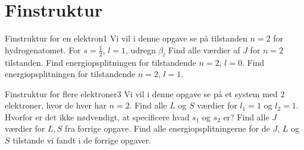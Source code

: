 \section*{Finstruktur}
\begin{opgave}{Finstruktur for en elektron}{1}
Vi vil i denne opgave se på tilstanden $n=2$ for hydrogenatomet.
\opg For $s=\frac{1}{2}$, $l=1$, udregn $\beta_l$
\opg Find alle værdier af $J$ for $n=2$ tilstanden.
\opg Find energiopsplitningen for tilstandende $n=2$, $l=0$.
\opg Find energiopsplitningen for tilstandende $n=2$, $l=1$.
\end{opgave}
%
\begin{opgave}{Finstruktur for flere elektroner}{3}
Vi vil i denne opgave se på et system med 2 elektroner, hvor de hver har $n=2$.
\opg Find alle $L$ og $S$ værdier for $l_1=1$ og $l_2=1$. Hvorfor er det ikke nødvendigt, at specificere hvad $s_1$ og $s_2$ er?
\opg Find alle $J$ værdier for $L,S$ fra forrige opgave.
\opg Find alle energiopsplitningerne for de $J$, $L$ og $S$ tilstande vi fandt i de forrige opgaver. 
\end{opgave}

